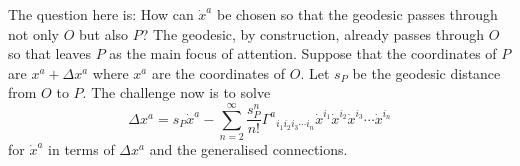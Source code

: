\documentclass[a4paper,12pt]{article}
\numberwithin{equation}{section}
\begin{document}
The question here is: How can ${\Dot x}^a$ be chosen so that the geodesic passes through not
only $O$ but also $P$? The geodesic, by construction, already passes through $O$
so that leaves $P$ as the main focus of attention. Suppose that the coordinates of $P$ are
$x^a + \Delta x^a$ where $x^a$ are the coordinates of $O$. Let $s_P$ be the geodesic
distance from $O$ to $P$. The challenge now is to solve
\[
\Delta x^a = s_P {\Dot x}^a
           - \sum_{n=2}^\infty \frac{s_P^n}{n!}\Gamma^{a}{}_{i_1i_2i_3\cdots i_n}
                                               {\Dot x}^{i_1}
                                               {\Dot x}^{i_2}
                                               {\Dot x}^{i_3}\cdots
                                               {\Dot x}^{i_n}
\]
for ${\Dot x}^a$ in terms of $\Delta x^a$ and the generalised connections.
\end{document}
